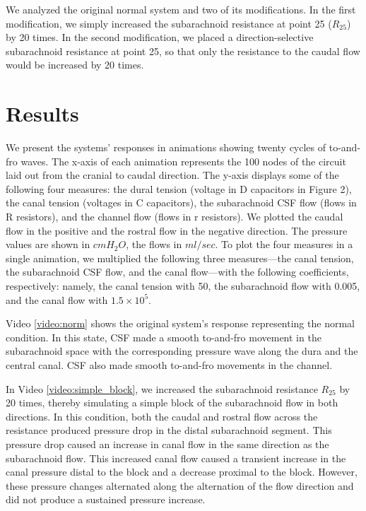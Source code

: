\documentclass[fleqn,10pt]{wlscirep}
\begin{document}
We analyzed the original normal system and two of its modifications. In the
first modification, we simply increased the subarachnoid resistance at
point 25 ($R_{25}$) by 20 times. In the second modification, we placed a
direction-selective subarachnoid resistance at point 25, so that only the
resistance to the caudal flow would be increased by 20 times.

\section*{Results}

We present the systems' responses in animations showing twenty cycles of
to-and-fro waves. The x-axis of each animation represents the 100 nodes of
the circuit laid out from the cranial to caudal direction. The y-axis
displays some of the following four measures: the dural tension (voltage in
D capacitors in Figure 2), the canal tension (voltages in C capacitors),
the subarachnoid CSF flow (flows in R resistors), and the channel flow
(flows in r resistors). We plotted the caudal flow in the positive and the
rostral flow in the negative direction. The pressure values are shown in
$cmH_2O$, the flows in $ml/sec$. To plot the four measures in a single
animation, we multiplied the following three measures---the canal tension,
the subarachnoid CSF flow, and the canal flow---with the following
coefficients, respectively: namely, the canal tension with 50, the
subarachnoid flow with 0.005, and the canal flow with $1.5\times10^{5}$. 

Video \ref{video:norm} shows the original system's response representing
the normal condition. In this state, CSF made a smooth to-and-fro movement
in the subarachnoid space with the corresponding pressure wave along the
dura and the central canal. CSF also made smooth to-and-fro movements in
the channel.


In Video \ref{video:simple_block}, we increased the subarachnoid resistance
$R_{25}$ by 20 times, thereby simulating a simple block of the subarachnoid
flow in both directions. In this condition, both the caudal and rostral
flow across the resistance produced pressure drop in the distal
subarachnoid segment.  This pressure drop caused an increase in canal flow
in the same direction as the subarachnoid flow. This increased canal flow
caused a transient increase in the canal pressure distal to the block and a
decrease proximal to the block. However, these pressure changes alternated
along the alternation of the flow direction and did not produce a sustained
pressure increase.
\end{document}
